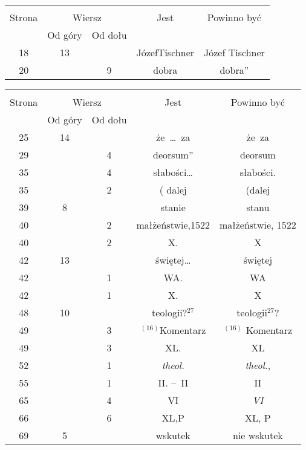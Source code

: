 \documentclass[a4paper,11pt]{article}
\begin{document}
\begin{center}

  \begin{tabular}{|c|c|c|c|c|}
    \hline
    & \multicolumn{2}{c|}{} & & \\
    Strona & \multicolumn{2}{c|}{Wiersz} & Jest
                              & Powinno być \\ \cline{2-3}
    & Od góry & Od dołu & & \\
    \hline
    18  & 13 & & JózefTischner & Józef Tischner \\
    20  & &  9 & dobra & dobra” \\
    \hline
  \end{tabular}




  \begin{tabular}{|c|c|c|c|c|}
    \hline
    & \multicolumn{2}{c|}{} & & \\
    Strona & \multicolumn{2}{c|}{Wiersz} & Jest
                              & Powinno być \\ \cline{2-3}
    & Od góry & Od dołu & & \\
    \hline
    25  & 14 & & że~\ldots~za & że~za \\
    29  & &  4 & deorsum” & deorsum \\
    35  & &  4 & słabości\ldots & słabości. \\
    35  & &  2 & ( dalej & (dalej \\
    39  &  8 & & stanie & stanu \\
    40  & &  2 & małżeństwie,1522 & małżeństwie, 1522 \\
    40  & &  2 & X. & X \\
    42  & 13 & & świętej\ldots & świętej \\
    42  & &  1 & WA. & WA \\
    42  & &  1 & X. & X \\
    48  & 10 & & teologii?$^{ 27 }$ & teologii$^{ 27 }$? \\
    49  & &  3 & $^{ ( 16 ) }$Komentarz & $^{ ( 16 ) }$ Komentarz \\
    49  & &  3 & XL. & XL \\
    52  & &  1 & \textit{theol.} & \textit{theol.}, \\
    55  & &  1 & II. --~II & II \\
    65  & &  4 & VI & \textit{VI} \\
    66  & &  6 & XL,P & XL, P \\
    69  &  5 & & wskutek & nie wskutek \\

\end{tabular}
\end{center}
\end{document}
